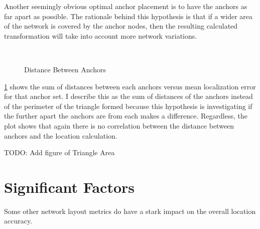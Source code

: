 Another seemingly obvious optimal anchor placement is to have the anchors as far apart as possible.  The rationale behind this hypothesis is that if a wider area of the network is covered by the anchor nodes, then the resulting calculated transformation will take into account more network variations.  

\begin{figure}
  \centering
		\\
    \label{fig:AnchorDistances}
	\caption{Distance Between Anchors}
\end{figure}

\ref{fig:AnchorDistances} shows the sum of distances between each anchors versus mean localization error for that anchor set. I describe this as the sum of distances of the anchors instead of the perimeter of the triangle formed because this hypothesis is investigating if the further apart the anchors are from each makes a difference. Regardless, the plot shows that again there is no correlation between the distance between anchors and the location calculation.

TODO: Add figure of Triangle Area

\section{Significant Factors}

Some other network layout metrics do have a stark impact on the overall location accuracy.

